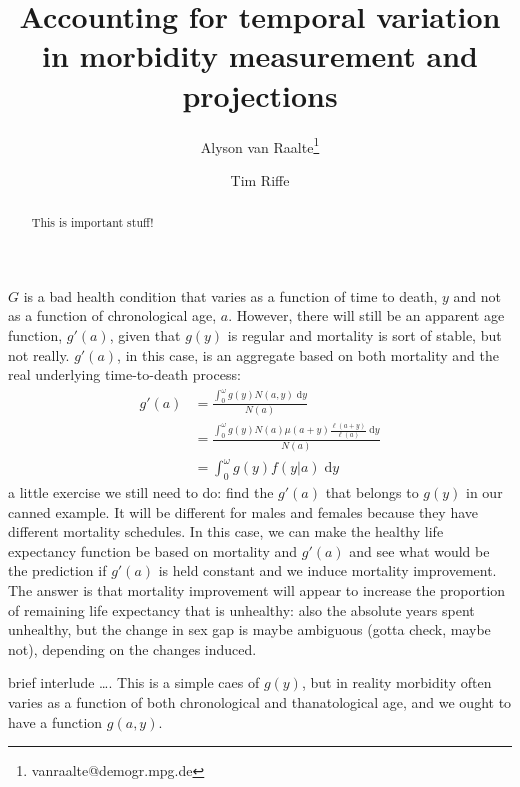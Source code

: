 \documentclass[11pt,oneside,a4paper]{article} %
\newcommand{\dd}{\; \mathrm{d}}
\begin{document}
\title{Accounting for temporal variation in morbidity measurement
and projections}

\author[1]{Alyson van Raalte\thanks{vanraalte@demogr.mpg.de}}
\author[1]{Tim Riffe}


\maketitle

\begin{abstract}
This is important stuff!
\end{abstract}

$G$ is a bad health condition that varies as a function of time to death,
$y$ and not as a function of chronological age, $a$. However, there will still be an
apparent age function, $g'(a)$, given that $g(y)$ is regular and mortality is
sort of stable, but not really. $g'(a)$, in this case, is an aggregate based on
both mortality and the real underlying time-to-death process:
\begin{align}
g'(a) &= \frac{\int _0^\omega g(y) N(a,y) \dd y}{N(a)} \\
      &= \frac{\int _0^\omega g(y) N(a)
      \mu(a+y)\frac{\ell(a+y)}{\ell(a)}\dd y}{N(a)}\\
      &= \int _0^\omega g(y) f(y|a)\dd y
\end{align}
a little exercise we still need to do: find the $g'(a)$ that belongs to $g(y)$
in our canned example. It will be different for males and females because they
have different mortality schedules. In this case, we can make the healthy life
expectancy function be based on mortality and $g'(a)$ and see what would be the
prediction if $g'(a)$ is held constant and we induce mortality improvement. The
answer is that mortality improvement will appear to increase the proportion of
remaining life expectancy that is unhealthy: also the absolute years spent
unhealthy, but the change in sex gap is maybe ambiguous (gotta check, maybe
not), depending on the changes induced.


brief interlude \ldots.
This is a simple caes of $g(y)$, but in reality morbidity often varies as a
function of both chronological and thanatological age, and we ought to have a
function $g(a,y)$.
\end{document}
